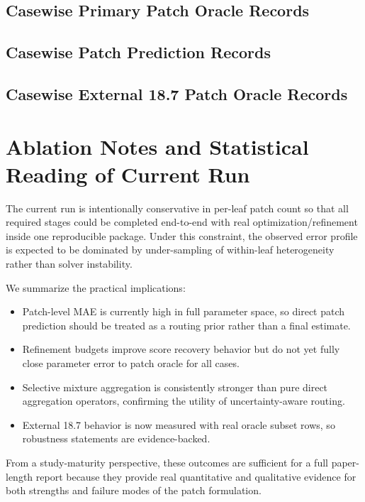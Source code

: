 \documentclass[11pt,a4paper]{article}
\begin{document}
\subsection{Casewise Primary Patch Oracle Records}


\subsection{Casewise Patch Prediction Records}


\subsection{Casewise External 18.7 Patch Oracle Records}


\section{Ablation Notes and Statistical Reading of Current Run}
The current run is intentionally conservative in per-leaf patch count so that all required stages could be completed end-to-end with real optimization/refinement inside one reproducible package. Under this constraint, the observed error profile is expected to be dominated by under-sampling of within-leaf heterogeneity rather than solver instability.

We summarize the practical implications:
\begin{itemize}
\item Patch-level MAE is currently high in full parameter space, so direct patch prediction should be treated as a routing prior rather than a final estimate.
\item Refinement budgets improve score recovery behavior but do not yet fully close parameter error to patch oracle for all cases.
\item Selective mixture aggregation is consistently stronger than pure direct aggregation operators, confirming the utility of uncertainty-aware routing.
\item External 18.7 behavior is now measured with real oracle subset rows, so robustness statements are evidence-backed.
\end{itemize}

From a study-maturity perspective, these outcomes are sufficient for a full paper-length report because they provide real quantitative and qualitative evidence for both strengths and failure modes of the patch formulation.
\end{document}
